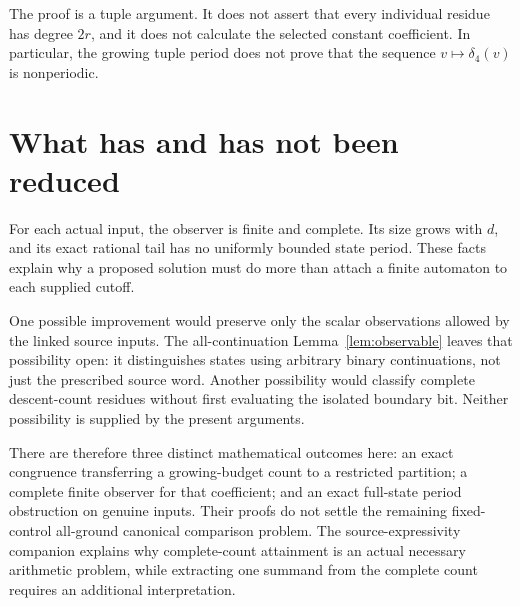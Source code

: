 \documentclass[11pt]{article}
\begin{document}
The proof is a tuple argument. It does not assert that every individual
residue has degree $2r$, and it does not calculate the selected
constant coefficient. In particular, the growing tuple period does
not prove that the sequence $v\mapsto\delta_4(v)$ is nonperiodic.

\section{What has and has not been reduced}

For each actual input, the observer is finite and complete. Its size
grows with $d$, and its exact rational tail has no uniformly bounded
state period. These facts explain why a proposed solution must do more
than attach a finite automaton to each supplied cutoff.

One possible improvement would preserve only the scalar observations
allowed by the linked source inputs. The all-continuation
Lemma~\ref{lem:observable} leaves that possibility open: it distinguishes
states using arbitrary binary continuations, not just the prescribed
source word. Another possibility would classify complete descent-count
residues without first evaluating the isolated boundary bit. Neither
possibility is supplied by the present arguments.

There are therefore three distinct mathematical outcomes here:
an exact congruence transferring a growing-budget count to a
restricted partition; a complete finite observer for that coefficient;
and an exact full-state period obstruction on genuine inputs.
Their proofs do not settle the remaining fixed-control all-ground
canonical comparison problem. The source-expressivity companion
\cite{wwexpressivity} explains why complete-count attainment is an
actual necessary arithmetic problem, while extracting one summand
from the complete count requires an additional interpretation.


\end{document}
